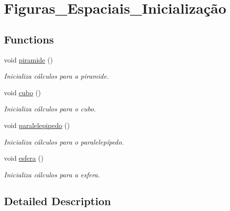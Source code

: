 \hypertarget{group__Figuras__Espaciais__Inicializa_xC3_xA7_xC3_xA3o}{}\section{Figuras\+\_\+\+Espaciais\+\_\+\+Inicialização}
\label{group__Figuras__Espaciais__Inicializa_xC3_xA7_xC3_xA3o}
\subsection*{Functions}
\begin{DoxyCompactItemize}
\item 
void \hyperlink{group__Figuras__Espaciais__Inicializa_xC3_xA7_xC3_xA3o_gae3945922f925bc3d1fd95c5dc4ff6987}{piramide} ()\hypertarget{group__Figuras__Espaciais__Inicializa_xC3_xA7_xC3_xA3o_gae3945922f925bc3d1fd95c5dc4ff6987}{}\label{group__Figuras__Espaciais__Inicializa_xC3_xA7_xC3_xA3o_gae3945922f925bc3d1fd95c5dc4ff6987}

\begin{DoxyCompactList}\small\item\em Inicializa cálculos para a piramide. \end{DoxyCompactList}\item 
void \hyperlink{group__Figuras__Espaciais__Inicializa_xC3_xA7_xC3_xA3o_gaf0b7d023166ce6902197d4082a66ad03}{cubo} ()\hypertarget{group__Figuras__Espaciais__Inicializa_xC3_xA7_xC3_xA3o_gaf0b7d023166ce6902197d4082a66ad03}{}\label{group__Figuras__Espaciais__Inicializa_xC3_xA7_xC3_xA3o_gaf0b7d023166ce6902197d4082a66ad03}

\begin{DoxyCompactList}\small\item\em Inicializa cálculos para o cubo. \end{DoxyCompactList}\item 
void \hyperlink{group__Figuras__Espaciais__Inicializa_xC3_xA7_xC3_xA3o_gaf5c3350f35c2d9ae97c0243b7aeac39e}{paralelepipedo} ()\hypertarget{group__Figuras__Espaciais__Inicializa_xC3_xA7_xC3_xA3o_gaf5c3350f35c2d9ae97c0243b7aeac39e}{}\label{group__Figuras__Espaciais__Inicializa_xC3_xA7_xC3_xA3o_gaf5c3350f35c2d9ae97c0243b7aeac39e}

\begin{DoxyCompactList}\small\item\em Inicializa cálculos para o paralelepípedo. \end{DoxyCompactList}\item 
void \hyperlink{group__Figuras__Espaciais__Inicializa_xC3_xA7_xC3_xA3o_ga947bf2f326598c591bbdbf77a0280266}{esfera} ()\hypertarget{group__Figuras__Espaciais__Inicializa_xC3_xA7_xC3_xA3o_ga947bf2f326598c591bbdbf77a0280266}{}\label{group__Figuras__Espaciais__Inicializa_xC3_xA7_xC3_xA3o_ga947bf2f326598c591bbdbf77a0280266}

\begin{DoxyCompactList}\small\item\em Inicializa cálculos para a esfera. \end{DoxyCompactList}\end{DoxyCompactItemize}


\subsection{Detailed Description}
